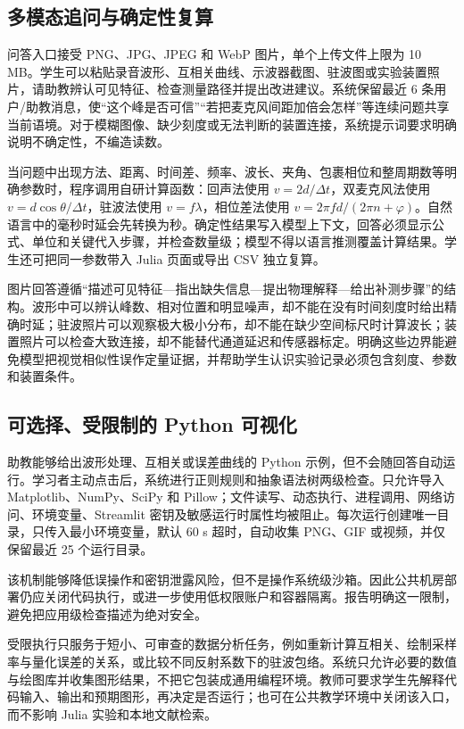 \documentclass[UTF8,a4paper,zihao=-4]{ctexart}
\begin{document}
\subsection{多模态追问与确定性复算}
问答入口接受 PNG、JPG、JPEG 和 WebP 图片，单个上传文件上限为 10 MB。学生可以粘贴录音波形、互相关曲线、示波器截图、驻波图或实验装置照片，请助教辨认可见特征、检查测量路径并提出改进建议。系统保留最近 6 条用户/助教消息，使“这个峰是否可信”“若把麦克风间距加倍会怎样”等连续问题共享当前语境。对于模糊图像、缺少刻度或无法判断的装置连接，系统提示词要求明确说明不确定性，不编造读数。

当问题中出现方法、距离、时间差、频率、波长、夹角、包裹相位和整周期数等明确参数时，程序调用自研计算函数：回声法使用 $v=2d/\Delta t$，双麦克风法使用 $v=d\cos\theta/\Delta t$，驻波法使用 $v=f\lambda$，相位差法使用 $v=2\pi fd/(2\pi n+\varphi)$。自然语言中的毫秒时延会先转换为秒。确定性结果写入模型上下文，回答必须显示公式、单位和关键代入步骤，并检查数量级；模型不得以语言推测覆盖计算结果。学生还可把同一参数带入 Julia 页面或导出 CSV 独立复算。

图片回答遵循“描述可见特征—指出缺失信息—提出物理解释—给出补测步骤”的结构。波形中可以辨认峰数、相对位置和明显噪声，却不能在没有时间刻度时给出精确时延；驻波照片可以观察极大极小分布，却不能在缺少空间标尺时计算波长；装置照片可以检查大致连接，却不能替代通道延迟和传感器标定。明确这些边界能避免模型把视觉相似性误作定量证据，并帮助学生认识实验记录必须包含刻度、参数和装置条件。

\subsection{可选择、受限制的 Python 可视化}
助教能够给出波形处理、互相关或误差曲线的 Python 示例，但不会随回答自动运行。学习者主动点击后，系统进行正则规则和抽象语法树两级检查。只允许导入 Matplotlib、NumPy、SciPy 和 Pillow；文件读写、动态执行、进程调用、网络访问、环境变量、Streamlit 密钥及敏感运行时属性均被阻止。每次运行创建唯一目录，只传入最小环境变量，默认 60 s 超时，自动收集 PNG、GIF 或视频，并仅保留最近 25 个运行目录。

该机制能够降低误操作和密钥泄露风险，但不是操作系统级沙箱。因此公共机房部署仍应关闭代码执行，或进一步使用低权限账户和容器隔离。报告明确这一限制，避免把应用级检查描述为绝对安全。

受限执行只服务于短小、可审查的数据分析任务，例如重新计算互相关、绘制采样率与量化误差的关系，或比较不同反射系数下的驻波包络。系统只允许必要的数值与绘图库并收集图形结果，不把它包装成通用编程环境。教师可要求学生先解释代码输入、输出和预期图形，再决定是否运行；也可在公共教学环境中关闭该入口，而不影响 Julia 实验和本地文献检索。
\end{document}
